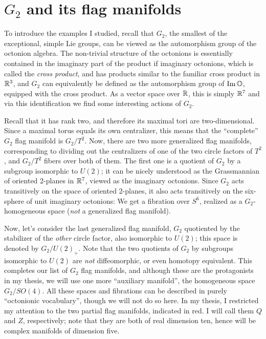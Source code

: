 \documentclass[parskip=half]{scrartcl}
\begin{document}
\section{\texorpdfstring{$G_2$}{G2} and its flag manifolds}

To introduce the examples I studied, recall that $G_2$, the smallest of the exceptional, simple Lie groups, can be viewed as the automorphism group of the octonion algebra. The non-trivial structure of the octonions is essentially contained in the imaginary part of the product if imaginary octonions, which is called the \emph{cross product}, and has products similar to the familiar cross product in $\mathbb{R}^3$, and $G_2$ can equivalently be defined as the automorphism group of $\operatorname{Im} \mathbb{O}$, equipped with the cross product. As a vector space over $\mathbb{R}$, this is simply $\mathbb{R}^7$ and via this identification we find some interesting actions of $G_2$.

Recall that it has rank two, and therefore its maximal tori are two-dimensional. Since a maximal torus equals its own centralizer, this means that the ``complete'' $G_2$ flag manifold is $G_2/T^2$. Now, there are two more generalized flag manifolds, corresponding to dividing out the centralizers of one of the two circle factors of $T^2$, and $G_2/T^2$ fibers over both of them. The first one is a quotient of $G_2$ by a subgroup isomorphic to $U(2)$; it can be nicely understood as the Grassmannian of oriented 2-planes in $\mathbb{R}^7$, viewed as the imaginary octonions. Since $G_2$ acts transitively on the space of oriented 2-planes, it also acts transitively on the six-sphere of unit imaginary octonions: We get a fibration over $S^6$, realized as a $G_2$-homogeneous space (\emph{not} a generalized flag manifold).

Now, let's consider the last generalized flag manifold, $G_2$ quotiented by the stabilizer of the \emph{other} circle factor, also isomorphic to $U(2)$; this space is denoted by $G_2/U(2)_+$. Note that the two quotients of $G_2$ by subgroups isomorphic to $U(2)$ are \emph{not} diffeomorphic, or even homotopy equivalent. This completes our list of $G_2$ flag manifolds, and although these are the protagonists in my thesis, we will use one more ``auxiliary manifold'', the homogeneous space $G_2/SO(4)$. All these spaces and fibrations can be described in purely ``octonionic vocabulary'', though we will not do so here. In my thesis, I restricted my attention to the two partial flag manifolds, indicated in red. I will call them $Q$ and $Z$, respectively; note that they are both of real dimension ten, hence will be complex manifolds of dimension five.
\end{document}
